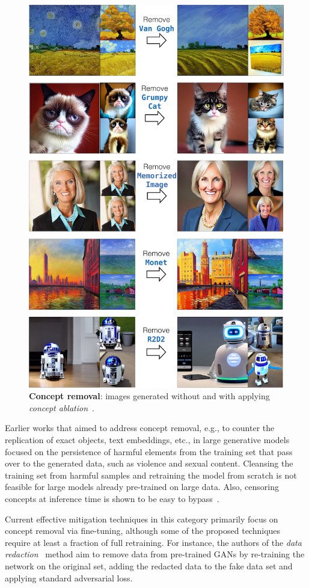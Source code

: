 \documentclass[conference,table]{IEEEtran}
\begin{document}
\begin{figure}[ht]
    \centering
    \includegraphics[width=0.8\linewidth]{ablating-concepts_vertical.png}
    \caption{\textbf{Concept removal}: images generated without and with applying \textit{concept ablation}~\cite{kumari_ablating_2023}.}
    \label{fig:ablation}
\end{figure}
Earlier works that aimed to address concept removal, e.g., to counter the replication of exact objects, text embeddings, etc., in large generative models focused on the persistence of harmful elements from the training set that pass over to the generated data, such as violence and sexual content. 
Cleansing the training set from harmful samples and retraining the model from scratch is not feasible for large models already pre-trained on large data. 
Also, censoring concepts at inference time is shown to be easy to bypass~\cite{rando_red-teaming_2022}.

Current effective mitigation techniques in this category primarily focus on concept removal via fine-tuning, although some of the proposed techniques require at least a fraction of full retraining. 
For instance, the authors of the \textit{data redaction}~\cite{kong_data_2023} method aim to remove data from pre-trained GANs by re-training the network on the original set, adding the redacted data to the fake data set and applying standard adversarial loss. 
\end{document}
